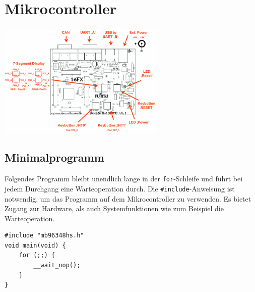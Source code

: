 \section{Mikrocontroller}

\begin{center}
	\includegraphics[width=0.6\textwidth]{figures/starterkit.png}
\end{center}


\subsection{Minimalprogramm}
Folgendes Programm bleibt unendlich lange in der \lstinline|for|-Schleife und führt bei jedem Durchgang eine Warteoperation durch.
Die \lstinline|#include|-Anweisung ist notwendig, um das Programm auf dem Mikrocontroller zu verwenden.
Es bietet Zugang zur Hardware, als auch Systemfunktionen wie zum Beispiel die Warteoperation.
\begin{lstlisting}
#include "mb96348hs.h"
void main(void) {
	for (;;) {
		__wait_nop();
	}
}
\end{lstlisting}


